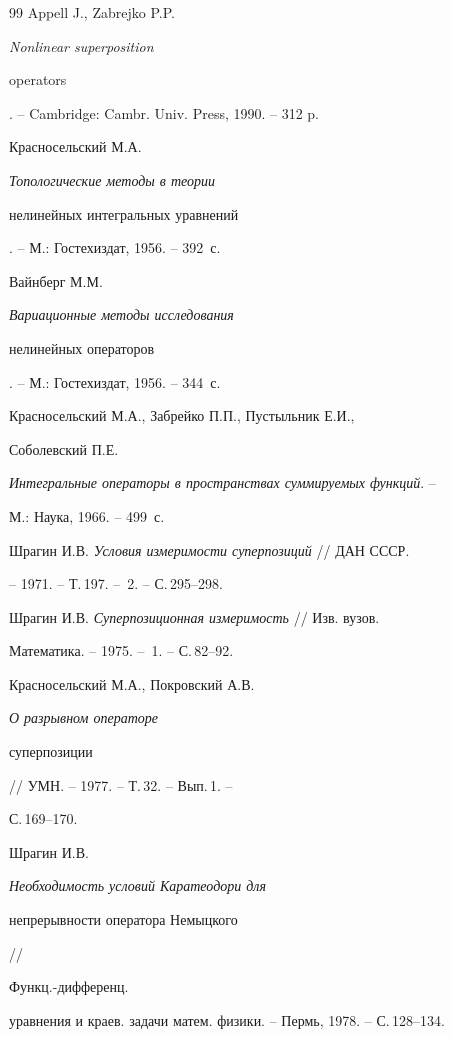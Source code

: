 \begin{thebibliography}{99}
 Appell J., Zabrejko P.P. {\it Nonlinear superposition


operators}. -- Cambridge: Cambr. Univ. Press, 1990. -- 312 p.





 Красносельский М.А. {\it Топологические методы в теории


нелинейных интегральных уравнений}. -- М.: Гос\-тех\-из\-дат, 1956. -- 392~с.





 Вайнберг М.М. {\it Вариационные методы исследования


нелинейных операторов}. -- М.: Гостехиздат, 1956. -- 344~с.





 Красносельский М.А., Забрейко П.П., Пустыльник Е.И.,


Соболевский П.Е.


{\it Интегральные операторы в пространствах суммируемых функций}. --


М.: Наука, 1966. -- 499~с.





 Шрагин И.В. {\it Условия измеримости суперпозиций} // ДАН СССР.


-- 1971. -- Т.\,197. -- \No\,2. -- С.\,295--298.





 Шрагин И.В. {\it Суперпозиционная измеримость} // Изв. вузов.


Математика. -- 1975. -- \No\,1. -- С.\,82--92.





 Красносельский М.А., Покровский А.В. {\it О разрывном операторе


суперпозиции} // УМН. -- 1977. -- Т.\,32. -- Вып.\,1. --


С.\,169--170.





 Шрагин И.В. {\it Необходимость условий Каратеодори для


непрерывности оператора Немыцкого} //


Функц.-дифференц.


уравнения и краев. задачи матем. физики. -- Пермь, 1978. -- С.\,128--134.






\end{thebibliography}
